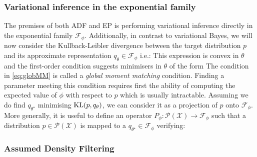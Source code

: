 
\subsubsection{Variational inference in the exponential family}

The premises of both ADF and EP is performing variational inference directly in the exponential family $\mathcal F_{\phi}$. 
Additionally, in contrast to variational Bayes, we will now consider the Kullback-Leibler divergence between the target distribution $p$ and its approximate representation $q_{\theta}\in\mathcal F_{\phi}$ i.e.:
%
%
This expression is convex in $\theta$ and the first-order condition suggests minimisers in $\theta$ of the form
%
%
The condition in \eqref{eq:globMM} is called a \emph{global moment matching} condition. 
Finding a parameter meeting this condition requires first the ability of computing the expected value of $\phi$ with respect to $p$ which is usually intractable.
Assuming we do find $q_{\theta^{\star}}$ minimising $\mathrm{KL}\!\left(p,q_{\theta}\right)$, we can consider it as a projection of $p$ onto $\mathcal F_{\phi}$. More generally, it is useful to define an operator $P_{\phi}:\mathcal P(\mathcal X)\to\mathcal F_{\phi}$ such that a distribution $p\in\mathcal P(\mathcal X)$ is mapped to a $q_{\theta^{\star}}\in\mathcal F_{\phi}$ verifying:
%
%
\subsubsection{Assumed Density Filtering}

